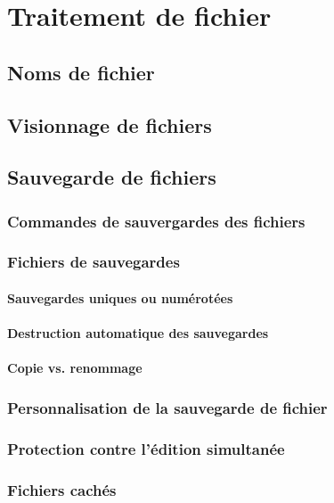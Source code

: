 \chapter{Traitement de fichier}\label{chap15}
\section{Noms de fichier}\label{chap15sec1}
\section{Visionnage de fichiers}\label{chap15sec2}
\section{Sauvegarde de fichiers}\label{chap15sec3}
\subsection{Commandes de sauvergardes des fichiers}\label{chap15sec3subsec1}
\subsection{Fichiers de sauvegardes}\label{chap15sec3subsec2}
\subsubsection{Sauvegardes uniques ou numérotées}
\subsubsection{Destruction automatique des sauvegardes}
\subsubsection{Copie vs. renommage}
\subsection{Personnalisation de la sauvegarde de
  fichier}\label{chap15sec3subsec3} 
\subsection{Protection contre l'édition simultanée}\label{chap15sec3subsec4}
\subsection{Fichiers cachés}\label{chap15sec3subsec5}

